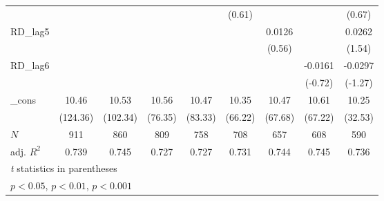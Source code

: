 {\begin{tabular}{l*{8}{c}}
            &                     &                     &                     &                     &      (0.61)         &                     &                     &      (0.67)         \\
\addlinespace
RD\_lag5     &                     &                     &                     &                     &                     &      0.0126         &                     &      0.0262         \\
            &                     &                     &                     &                     &                     &      (0.56)         &                     &      (1.54)         \\
\addlinespace
RD\_lag6     &                     &                     &                     &                     &                     &                     &     -0.0161         &     -0.0297         \\
            &                     &                     &                     &                     &                     &                     &     (-0.72)         &     (-1.27)         \\
\addlinespace
\_cons      &       10.46\sym{***}&       10.53\sym{***}&       10.56\sym{***}&       10.47\sym{***}&       10.35\sym{***}&       10.47\sym{***}&       10.61\sym{***}&       10.25\sym{***}\\
            &    (124.36)         &    (102.34)         &     (76.35)         &     (83.33)         &     (66.22)         &     (67.68)         &     (67.22)         &     (32.53)         \\
\midrule
\(N\)       &         911         &         860         &         809         &         758         &         708         &         657         &         608         &         590         \\
adj. \(R^{2}\)&       0.739         &       0.745         &       0.727         &       0.727         &       0.731         &       0.744         &       0.745         &       0.736         \\
\bottomrule
\multicolumn{9}{l}{\footnotesize \textit{t} statistics in parentheses}\\
\multicolumn{9}{l}{\footnotesize \sym{*} \(p<0.05\), \sym{**} \(p<0.01\), \sym{***} \(p<0.001\)}\\
\end{tabular}
}
